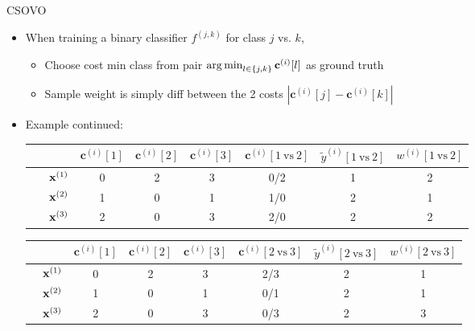 \documentclass[11pt,compress,t,notes=noshow, xcolor=table]{beamer}
\newcommand{\cv}{\mathbf{c}}
\begin{document}
\begin{frame}{CSOVO}
    \begin{itemize}
        \item When training a binary classifier $f^{(j, k)}$ for class $j$ vs. $k$,
        \begin{itemize}
            \item Choose cost min class from pair $\argmin_{l \in \{j, k\}} \cv^{(i)}[l]$ as ground truth 
            
            \item Sample weight is simply diff between the 2 costs      $|\cv^{(i)}[j] - \cv^{(i)}[k]|$

        \end{itemize}
        
        \item Example continued:
\begin{center}
    \footnotesize
                            \begin{tabular}{cc|ccc|ccc}\
        			& & $\cv^{(i)}[1]$ & $\cv^{(i)}[2]$ & $\cv^{(i)}[3]$ & $\cv^{(i)}[1 \ \text{vs} \ 2]$ & $\tilde{y}^{( i)}[1 \ \text{vs} \ 2]$ & $w^{(i)}[1 \ \text{vs} \ 2]$\\
        			\hline & $\mathbf{x}^{(1)}$ & 0 & 2 & 3 & 0/2 & 1 & 2\\
        			& $\mathbf{x}^{(2)}$ & 1 & 0 & 1 & 1/0 & 2 & 1 \\
                 	& $\mathbf{x}^{(3)}$ & 2 & 0 & 3 & 2/0 & 2 & 2\\
                \end{tabular}

                \begin{tabular}{cc|ccc|ccc}
        			& & $\cv^{(i)}[1]$ & $\cv^{(i)}[2]$ & $\cv^{(i)}[3]$ & $\cv^{(i)}[2 \ \text{vs} \ 3]$ & $\tilde{y}^{( i)}[2 \ \text{vs} \ 3]$ & $w^{(i)}[2 \ \text{vs} \ 3]$\\
        			\hline & $\mathbf{x}^{(1)}$ & 0 & 2 & 3 & 2/3 & 2 & 1\\
        			& $\mathbf{x}^{(2)}$ & 1 & 0 & 1 & 0/1 & 2 & 1\\
                 	& $\mathbf{x}^{(3)}$ & 2 & 0 & 3 & 0/3 & 2 & 3\\
                \end{tabular}
\end{center}

    \end{itemize}
\end{frame}
\end{document}
